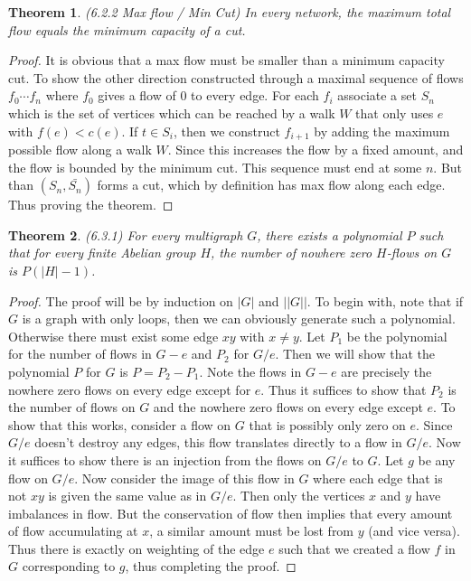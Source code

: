 \documentclass[12pt]{article}
\newtheorem{theorem}{Theorem}
\begin{document}
\begin{theorem} (6.2.2 Max flow / Min Cut) In every network, the
  maximum total flow equals the minimum capacity of a cut.
\end{theorem}
\begin{proof} It is obvious that a max flow must be smaller than a
  minimum capacity cut. To show the other direction constructed
  through a maximal sequence of flows $f_0 \cdots f_n$ where $f_0$
  gives a flow of 0 to every edge. For each $f_i$ associate a set
  $S_n$ which is the set of vertices which can be reached by a walk
  $W$ that only uses $e$ with $f(e) < c(e)$. If $t \in S_i$, then we
  construct $f_{i + 1}$ by adding the maximum possible flow along a
  walk $W$. Since this increases the flow by a fixed amount, and the
  flow is bounded by the minimum cut. This sequence must end at some
  $n$. But than $(S_n, \bar{S_n})$ forms a cut, which by definition
  has max flow along each edge. Thus proving the theorem.
\end{proof}

\begin{theorem} (6.3.1) For every multigraph $G$, there exists a
  polynomial $P$ such that for every finite Abelian group $H$, the
  number of nowhere zero $H$-flows on $G$ is $P(|H| - 1)$.
\end{theorem}
\begin{proof} The proof will be by induction on $|G|$ and $||G||$. To
  begin with, note that if $G$ is a graph with only loops, then we can
  obviously generate such a polynomial. Otherwise there must exist
  some edge $xy$ with $x \neq y$. Let $P_1$ be the polynomial for the
  number of flows in $G-e$ and $P_2$ for $G/e$. Then we will show that
  the polynomial $P$ for $G$ is $P= P_2 - P_1$. Note the flows in
  $G-e$ are precisely the nowhere zero flows on every edge except for
  $e$. Thus it suffices to show that $P_2$ is the number of flows on
  $G$ and the nowhere zero flows on every edge except $e$. To show
  that this works, consider a flow on $G$ that is possibly only zero
  on $e$. Since $G/e$ doesn't destroy any edges, this flow translates
  directly to a flow in $G/e$. Now it suffices to show there is an
  injection from the flows on $G/e$ to $G$. Let $g$ be any flow on
  $G/e$. Now consider the image of this flow in $G$ where each edge
  that is not $xy$ is given the same value as in $G/e$. Then only the
  vertices $x$ and $y$ have imbalances in flow. But the conservation
  of flow then implies that every amount of flow accumulating at $x$,
  a similar amount must be lost from $y$ (and vice versa). Thus there
  is exactly on weighting of the edge $e$ such that we created a flow
  $f$ in $G$ corresponding to $g$, thus completing the proof.
\end{proof}
\end{document}
